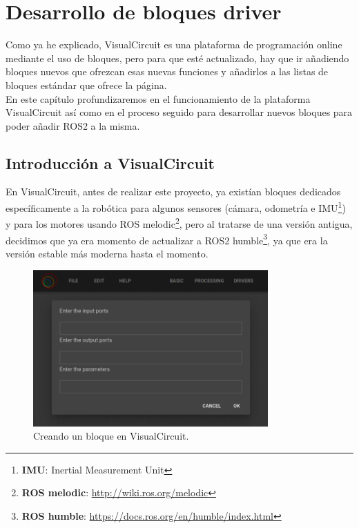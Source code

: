 \chapter{Desarrollo de bloques driver}
\label{cap:capitulo4}
Como ya he explicado, VisualCircuit es una plataforma de programación online mediante el uso de bloques, pero para que esté actualizado,
hay que ir añadiendo bloques nuevos que ofrezcan esas nuevas funciones y añadirlos a las listas de bloques estándar que ofrece la página.\\
En este capítulo profundizaremos en el funcionamiento de la plataforma VisualCircuit así como en el proceso seguido para desarrollar nuevos
bloques para poder añadir ROS2 a la misma.


\section{Introducción a VisualCircuit}
\label{sec:VC_intro}

En VisualCircuit, antes de realizar este proyecto, ya existían bloques dedicados específicamente a la robótica para algunos sensores
(cámara, odometría e IMU\footnote{\textbf{IMU}: Inertial Measurement Unit}) y para los motores usando ROS
melodic\footnote{\textbf{ROS melodic}: \url{http://wiki.ros.org/melodic}}, pero al tratarse de una versión antigua, decidimos que ya era
momento de actualizar a ROS2 humble\footnote{\textbf{ROS humble}: \url{https://docs.ros.org/en/humble/index.html}}, ya que era la versión estable
más moderna hasta el momento.
\begin{figure} [H]
  \begin{center}
      \includegraphics[width=9cm]{figs/c4/VC_pre_codeblock.png}
  \end{center}
  \caption[Creando un bloque en VisualCircuit]{Creando un bloque en VisualCircuit.}
  \label{fig:VC_creando_bloque}
\end{figure}

